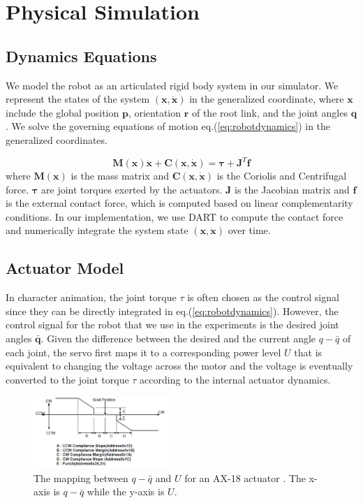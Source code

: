 \section{Physical Simulation}

\subsection{Dynamics Equations}

We model the robot as an articulated rigid body system in our simulator. We represent the states of the system $(\mathbf{x}, \dot{\mathbf{x}})$ in the generalized coordinate, where $\mathbf{x}$ include the global position $\mathbf{p}$, orientation $\mathbf{r}$ of the root link, and the joint angles $\mathbf{q}$. We solve the governing equations of motion eq.(\ref{eq:robotdynamics}) in the generalized coordinates.

\begin{equation}
\label{eq:robotdynamics}
\mathbf{M}(\mathbf{x})\mathbf{\ddot{x}}+\mathbf{C}(\mathbf{x},\mathbf{\dot{x}})=\mathbf{\tau}+\mathbf{J}^T\mathbf{f}
\end{equation}
where $\mathbf{M}(\mathbf{x})$ is the mass matrix and $\mathbf{C}(\mathbf{x},\mathbf{\dot{x}})$ is the Coriolis and Centrifugal force. $\mathbf{\tau}$ are joint torques exerted by the actuators. $\mathbf{J}$ is the Jacobian matrix and $\mathbf{f}$ is the external contact force, which is computed based on linear complementarity conditions. In our implementation, we use DART to compute the contact force and numerically integrate the system state $(\mathbf{x}, \dot{\mathbf{x}})$ over time.

\subsection{Actuator Model}
\label{sec:motorDynamics}
In character animation, the joint torque $\tau$ is often chosen as the control signal since they can be directly integrated in eq.(\ref{eq:robotdynamics}). However, the control signal for the robot that we use in the experiments is the desired joint angles $\bar{\mathbf{q}}$. Given the difference between the desired and the current angle ${q-\bar{q}}$ of each joint, the servo first maps it to a corresponding power level $U$ that is equivalent to changing the voltage across the motor and the voltage is eventually converted to the joint torque $\tau$ according to the internal actuator dynamics.

\begin{figure}[t]
\centering
\includegraphics[width=0.45\textwidth]{figures/ax18gain.eps}
\caption{The mapping between $q-\bar{q}$ and $U$ for an AX-18 actuator \cite{AX18:2015}. The x-axis is $q-\bar{q}$ while the y-axis is $U$.}
\label{fig:actuatorMap}
\end{figure}

